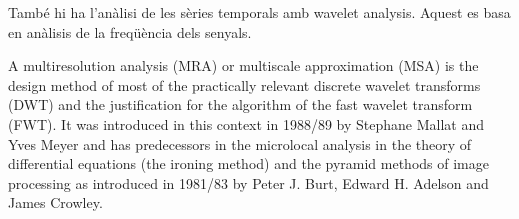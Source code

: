 
També hi ha l'anàlisi de les sèries temporals amb wavelet analysis. Aquest es basa en anàlisis de la freqüència dels senyals. 

A multiresolution analysis (MRA) or multiscale approximation (MSA) is the design method of most of the practically relevant discrete wavelet transforms (DWT) and the justification for the algorithm of the fast wavelet transform (FWT). It was introduced in this context in 1988/89 by Stephane Mallat and Yves Meyer and has predecessors in the microlocal analysis in the theory of differential equations (the ironing method) and the pyramid methods of image processing as introduced in 1981/83 by Peter J. Burt, Edward H. Adelson and James Crowley.






\todo{}



